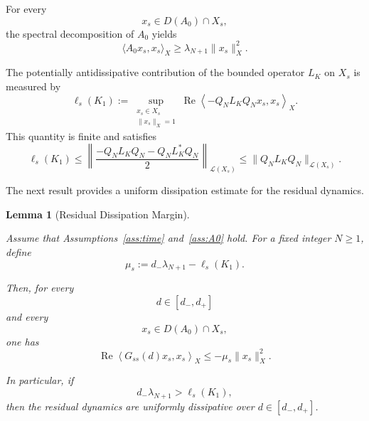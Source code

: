 \documentclass[pdflatex,sn-mathphys-num]{sn-jnl}
\theoremstyle{thmstyleone}%
\theoremstyle{thmstyletwo}%
\theoremstyle{thmstylethree}%
\newtheorem{lemma}{Lemma}
\begin{document}
For every
\[
x_s\in D(A_0)\cap X_s,
\]
the spectral decomposition of \(A_0\) yields
\begin{equation}
\langle A_0x_s,x_s\rangle_X
\ge
\lambda_{N+1}\|x_s\|_X^2.
\label{eq:residual-spectral-coercivity}
\end{equation}

The potentially antidissipative contribution of the bounded operator
\(L_K\) on \(X_s\) is measured by
\begin{equation}
\ell_s(K_1)
:=
\sup_{\substack{x_s\in X_s\\ \|x_s\|_X=1}}
\operatorname{Re}
\left\langle
-Q_NL_KQ_Nx_s,x_s
\right\rangle_X.
\label{eq:ell-s-definition}
\end{equation}
This quantity is finite and satisfies
\begin{equation}
\ell_s(K_1)
\le
\left\|
\frac{
-Q_NL_KQ_N-Q_NL_K^*Q_N
}{2}
\right\|_{\mathcal L(X_s)}
\le
\|Q_NL_KQ_N\|_{\mathcal L(X_s)}.
\label{eq:ell-s-upper-bound}
\end{equation}

The next result provides a uniform dissipation estimate for the residual dynamics.

\begin{lemma}[Residual Dissipation Margin]
\label{lem:uniform-high-frequency-dissipation}

Assume that Assumptions~\ref{ass:time} and~\ref{ass:A0} hold. For a fixed integer \(N\ge1\), define
\begin{equation}
\mu_s
:=
d_-\lambda_{N+1}
-
\ell_s(K_1).
\label{eq:residual-margin}
\end{equation}

Then, for every
\[
d\in[d_-,d_+]
\]
and every
\[
x_s\in D(A_0)\cap X_s,
\]
one has
\begin{equation}
\operatorname{Re}
\left\langle
G_{ss}(d)x_s,x_s
\right\rangle_X
\le
-\mu_s\|x_s\|_X^2.
\label{eq:uniform-residual-dissipation}
\end{equation}

In particular, if
\begin{equation}
d_-\lambda_{N+1}
>
\ell_s(K_1),
\label{eq:positive-residual-margin}
\end{equation}
then the residual dynamics are uniformly dissipative over \(d\in[d_-,d_+]\).

\end{lemma}
\end{document}
